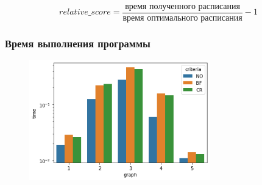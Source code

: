\begin{frame}
    \begin{equation*}
        relative\_score = \frac{\text{время полученного расписания}}{\text{время оптимального расписания}} - 1
    \end{equation*}
\end{frame}

\begin{frame}
    \frametitle{Время выполнения программы}
    \begin{figure}
        \includegraphics[width=0.7\textwidth]{imgs/times.png}
    \end{figure}
\end{frame}